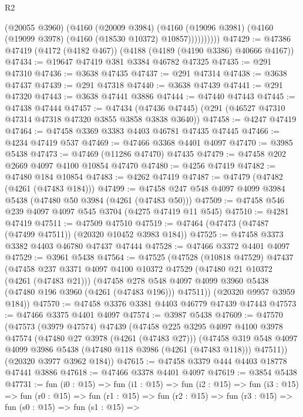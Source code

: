 \begin{lexlean}{R2}
\begin{coremodule}
                (@20055 @3960)
                (@4160
                  (@20009 @3984)
                  (@4160
                    (@19096 @3981)
                    (@4160 (@19099 @3978) (@4160 (@18530 @10372) @10857))))))))))
@47429 := @47386 @47419 (@4172 (@4182 @467)) (@4188 (@4189 (@4190 @3386) @40666 @4167))
@47434 := @19647 @47419 @381 @3384 @46782 @47325
@47435 := @291 @47310
@47436 := @3638 @47435
@47437 := @291 @47314
@47438 := @3638 @47437
@47439 := @291 @47318
@47440 := @3638 @47439
@47441 := @291 @47320
@47443 := @3638 @47441 @3886
@47444 := @47440 @47443
@47445 := @47438 @47444
@47457 := @47434 (@47436 @47445) (@291 (@46527 @47310 @47314 @47318 @47320 @3855 @3858 @3838 @3640))
@47458 := @4247 @47419
@47464 := @47458 @3369 @3383 @4403 @46781 @47435 @47445
@47466 := @4234 @47419 @537
@47469 := @47466 @3368 @4401 @4097
@47470 := @3985 @5438
@47473 := @47469 (@11286 @47470) @47435
@47479 := @47458 @202 @2669 @4097 @4100 @10854 @47470
@47480 := @4256 @47419
@47482 := @47480 @184 @10854
@47483 := @4262 @47419
@47487 := @47479 (@47482 (@4261 (@47483 @184)))
@47499 := @47458 @247 @548 @4097 @4099 @3984 @5438 (@47480 @50 @3984 (@4261 (@47483 @50)))
@47509 := @47458 @546 @239 @4097 @4097 @545 @3704 (@4275 @47419 @11 @545)
@47510 := @4281 @47419
@47511 := @47509 @47510
@47519 := @47464 (@47473 (@47487 (@47499 @47511)) (@20320 @10452 @3983 @184))
@47525 := @47458 @3373 @3382 @4403 @46780 @47437 @47444
@47528 := @47466 @3372 @4401 @4097
@47529 := @3961 @5438
@47564 := @47525
    (@47528
      (@10818 @47529)
      @47437
      (@47458
        @237
        @3371
        @4097
        @4100
        @10372
        @47529
        (@47480 @21 @10372 (@4261 (@47483 @21)))
        (@47458 @278 @548 @4097 @4099 @3960 @5438 (@47480 @196 @3960 (@4261 (@47483 @196))) @47511))
      (@20320 @9957 @3959 @184))
@47570 := @47458 @3376 @3381 @4403 @46779 @47439 @47443
@47573 := @47466 @3375 @4401 @4097
@47574 := @3987 @5438
@47609 := @47570
    (@47573
      (@3979 @47574)
      @47439
      (@47458
        @225
        @3295
        @4097
        @4100
        @3978
        @47574
        (@47480 @27 @3978 (@4261 (@47483 @27)))
        (@47458 @319 @548 @4097 @4099 @3986 @5438 (@47480 @118 @3986 (@4261 (@47483 @118))) @47511))
      (@20320 @3977 @3962 @184))
@47615 := @47458 @3379 @444 @4403 @18778 @47441 @3886
@47618 := @47466 @3378 @4401 @4097
@47619 := @3854 @5438
@47731 := fun (i0 : @15) =>
  fun (i1 : @15) =>
  fun (i2 : @15) =>
  fun (i3 : @15) =>
  fun (r0 : @15) =>
  fun (r1 : @15) =>
  fun (r2 : @15) =>
  fun (r3 : @15) =>
  fun (s0 : @15) =>
  fun (s1 : @15) =>

\end{coremodule}
\end{lexlean}
